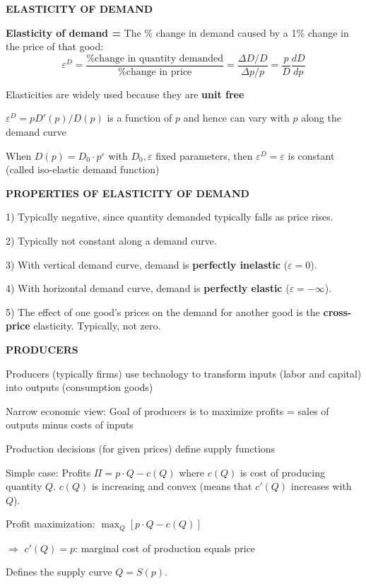 \documentclass[landscape]{slides}
\begin{document}
\begin{slide}
\begin{center}
{\bf ELASTICITY OF DEMAND}
\end{center}
\textbf{Elasticity of demand =} The \% change in demand caused by a 1\% change in the price of that good:
\bigskip
\[ \varepsilon^D=\frac{\mbox{\% change in quantity demanded}}{\mbox{\% change in price}}=\frac{\Delta D/D}{\Delta p/p}= \frac{p}{D} \frac{dD}{dp} \]

Elasticities are widely used because they are \textbf{unit free}

$\varepsilon^D=p D'(p)/D(p)$ is a function of $p$ and hence can vary with $p$ along the demand
curve

When $D(p)=D_0 \cdot p^{\varepsilon}$ with $D_0, \varepsilon$ fixed parameters,
then $\varepsilon^D = \varepsilon$ is constant (called iso-elastic demand function)


\end{slide}

\begin{slide}
\begin{center}
{\bf PROPERTIES OF ELASTICITY OF DEMAND}
\end{center}

1) Typically negative, since quantity demanded typically falls as price rises.

2) Typically not constant along a demand curve.

3) With vertical demand curve, demand is \textbf{perfectly inelastic} ($\varepsilon=0$).

4) With horizontal demand curve, demand is \textbf{perfectly elastic} ($\varepsilon=-\infty$).

5) The effect of one good's prices on the demand for another good is the \textbf{cross-price} elasticity. Typically, not zero.

\end{slide}

\begin{slide}
\begin{center}
{\bf PRODUCERS}
\end{center}

Producers (typically firms) use technology to transform inputs (labor and capital) into outputs (consumption goods)

Narrow economic view: Goal of producers is to maximize profits = sales of outputs minus costs of inputs

Production decisions (for given prices) define supply functions

Simple case:  Profits $ \Pi = p \cdot Q - c(Q)$ where $c(Q)$ is cost of producing quantity $Q$.
$c(Q)$ is increasing and convex (means that $c'(Q)$ increases with $Q$).

Profit maximization: $\max_Q  [ p \cdot Q - c(Q)]$

$\Rightarrow$  $c'(Q) = p$:
marginal cost of production equals price

Defines the supply curve $Q=S(p)$.



\end{slide}
\end{document}
